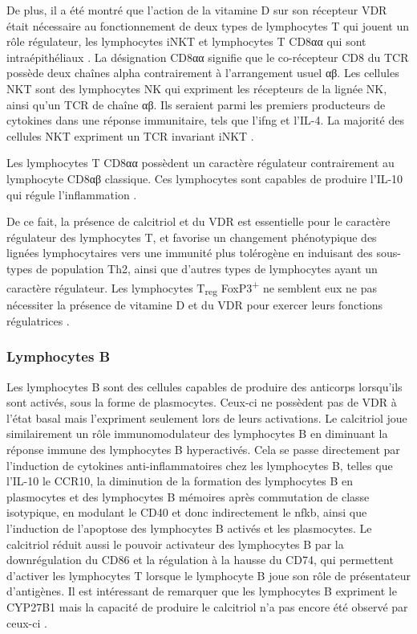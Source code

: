 \documentclass[
  a4paper,
  DIV=11,
  numbers=noendperiod,
  listof=totoc]{scrreprt}
\begin{document}
De plus, il a été montré que l'action de la vitamine D sur son récepteur
VDR était nécessaire au fonctionnement de deux types de lymphocytes T
qui jouent un rôle régulateur, les lymphocytes \ac{iNKT} et lymphocytes
T CD8αα qui sont intraépithéliaux \autocite{Cheroutre.2008}. La
désignation CD8αα signifie que le co-récepteur CD8 du \ac{TCR} possède
deux chaînes alpha contrairement à l'arrangement usuel αβ. Les cellules
NKT sont des lymphocytes NK qui expriment les récepteurs de la lignée
NK, ainsi qu'un \ac{TCR} de chaîne αβ. Ils seraient parmi les premiers
producteurs de cytokines dans une réponse immunitaire, tels que
l'\ac{ifng} et l'\ac{IL-4}. La majorité des cellules NKT expriment un
TCR invariant \acs{iNKT} \autocite{Cantorna.2010}.

Les lymphocytes T CD8αα possèdent un caractère régulateur contrairement
au lymphocyte CD8αβ classique. Ces lymphocytes sont capables de produire
l'\ac{IL-10} qui régule l'inflammation \autocite{Cantorna.2010}.

De ce fait, la présence de calcitriol et du \ac{VDR} est essentielle
pour le caractère régulateur des lymphocytes T, et favorise un
changement phénotypique des lignées lymphocytaires vers une immunité
plus tolérogène en induisant des sous-types de population Th2, ainsi que
d'autres types de lymphocytes ayant un caractère régulateur. Les
lymphocytes T\textsubscript{reg} FoxP3\textsuperscript{+} ne semblent
eux ne pas nécessiter la présence de vitamine D et du \ac{VDR} pour
exercer leurs fonctions régulatrices \autocite{Cantorna.2010}.

\hypertarget{lymphocytes-b}{%
\subsubsection{Lymphocytes B}\label{lymphocytes-b}}

Les lymphocytes B sont des cellules capables de produire des anticorps
lorsqu'ils sont activés, sous la forme de plasmocytes. Ceux-ci ne
possèdent pas de VDR à l'état basal mais l'expriment seulement lors de
leurs activations. Le calcitriol joue similairement un rôle
immunomodulateur des lymphocytes B en diminuant la réponse immune des
lymphocytes B hyperactivés. Cela se passe directement par l'induction de
cytokines anti-inflammatoires chez les lymphocytes B, telles que
l'\ac{IL-10} le \ac{CCR10}, la diminution de la formation des
lymphocytes B en plasmocytes et des lymphocytes B mémoires après
commutation de classe isotypique, en modulant le CD40 et donc
indirectement le \ac{nfkb}, ainsi que l'induction de l'apoptose des
lymphocytes B activés et les plasmocytes. Le calcitriol réduit aussi le
pouvoir activateur des lymphocytes B par la downrégulation du CD86 et la
régulation à la hausse du CD74, qui permettent d'activer les lymphocytes
T lorsque le lymphocyte B joue son rôle de présentateur d'antigènes. Il
est intéressant de remarquer que les lymphocytes B expriment le
\ac{CYP27B1} mais la capacité de produire le calcitriol n'a pas encore
été observé par ceux-ci \autocite{Meza-Meza.2022,Martens.2020}.
\end{document}
